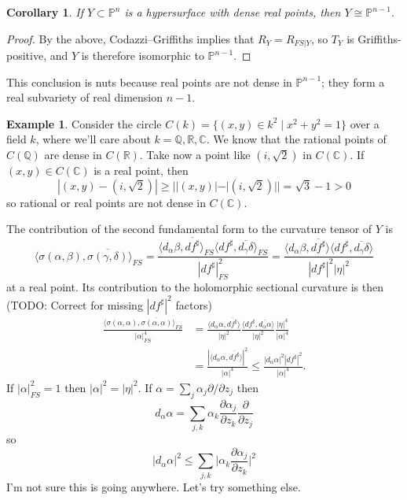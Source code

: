 \documentclass[11pt]{amsart}
\newtheorem{coro}[theo]{Corollary}
\theoremstyle{definition}
\newtheorem{exam}[theo]{Example}
\newcommand{\kk}[1]{\mathbb{#1}}
\def\ov#1{\overline{#1}}
\begin{document}
\begin{coro}
If $Y \subset \kk P^{n}$ is a hypersurface with dense real points, then $Y \cong \kk P^{n-1}$.
\end{coro}

\begin{proof}
By the above, Codazzi--Griffiths implies that $R_{Y} = R_{FS|Y}$, so $T_{Y}$ is Griffiths-positive, and $Y$ is therefore isomorphic to $\kk P^{n-1}$.
\end{proof}

This conclusion is nuts because real points are not dense in $\kk P^{n-1}$; they form a real subvariety of real dimension $n-1$.

\begin{exam}
Consider the circle $C(k) = \{(x,y) \in k^{2} \mid x^{2} + y^{2} = 1\}$ over a field $k$, where we'll care about $k = \kk Q, \kk R, \kk C$.
We know that the rational points of $C(\kk Q)$ are dense in $C(\kk R)$.
Take now a point like $(i,\sqrt 2)$ in $C(\kk C)$.
If $(x,y) \in  C(\kk C)$ is a real point, then
\[
  |(x,y) - (i,\sqrt 2)|
  \geq ||(x,y)| - |(i,\sqrt 2)||
  = \sqrt 3 - 1 > 0
\]
so rational or real points are not dense in $C(\kk C)$.
\end{exam}


The contribution of the second fundamental form to the curvature tensor of $Y$ is
\[
  \langle \sigma(\alpha, \beta), \ov{\sigma(\gamma, \delta)} \rangle_{FS}
  = \frac{\langle d_{\alpha}\beta, \ov{df^{\sharp}} \rangle_{FS}
  \langle df^{\sharp}, \ov{d_{\gamma}\delta} \rangle_{FS}}{|df^{\sharp}|^{2}_{FS}}
  = \frac{\langle d_{\alpha}\beta, \ov{df^{\sharp}} \rangle
  \langle df^{\sharp}, \ov{d_{\gamma}\delta} \rangle }{|df^{\sharp}|^{2}|\eta|^{2}}
\]
at a real point. Its contribution to the holomorphic sectional curvature is then
(TODO: Correct for missing $|df^{\sharp}|^{2}$ factors)
\begin{align*}
  \frac{\langle \sigma(\alpha, \alpha), \ov{\sigma(\alpha, \alpha)} \rangle_{FS}}{|\alpha|^{4}_{FS}}
  &= \frac{\langle d_{\alpha}\alpha, \ov{df^{\sharp}} \rangle}{|\eta|^{2}}
  \frac{\langle df^{\sharp}, \ov{d_{\alpha}\alpha} \rangle}{|\eta|^{2}}
  \frac{|\eta|^{4}}{|\alpha|^{4}}
    \\
  &= \frac{|\langle d_{\alpha}\alpha, \ov{df^{\sharp}} \rangle|^{2}}{|\alpha|^{4}}
  \leq \frac{|d_{\alpha}\alpha|^{2} |df^{\sharp}|^{2}}{|\alpha|^{4}}.
\end{align*}
If $|\alpha|^{2}_{FS} = 1$ then $|\alpha|^{2} = |\eta|^{2}$.
If $\alpha = \sum_{j} \alpha_{j} \partial / \partial z_{j}$ then
\[
  d_{\alpha} \alpha
  = \sum_{j,k} \alpha_{k} \frac{\partial{\alpha_{j}}}{\partial z_{k}} \frac{\partial}{\partial z_{j}}
\]
so
\[
  |d_{\alpha} \alpha|^{2}
  \leq \sum_{j,k}
  \biggl|
  \alpha_{k} \frac{\partial{\alpha_{j}}}{\partial z_{k}}
  \biggr|^{2}
\]
I'm not sure this is going anywhere. Let's try something else.
\end{document}
